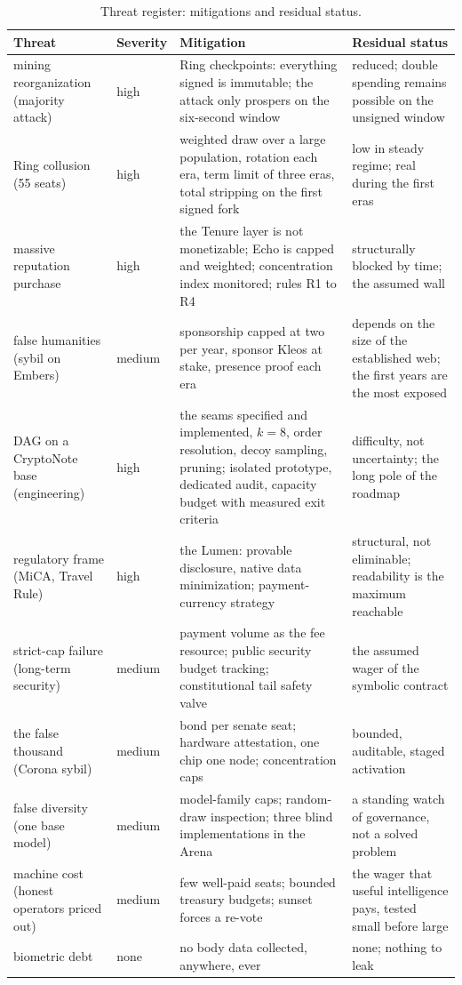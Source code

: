\begin{table}[htbp]
\centering
\small
\caption{Threat register: mitigations and residual status.}
\label{tab:threats}
\begin{tabularx}{\textwidth}{@{}L{3.4cm}L{1.5cm}YY@{}}
\toprule
Threat & Severity & Mitigation & Residual status \\
\midrule
mining reorganization (majority attack) & high & Ring checkpoints: everything signed is immutable; the attack only prospers on the six-second window & reduced; double spending remains possible on the unsigned window \\
Ring collusion (55 seats) & high & weighted draw over a large population, rotation each era, term limit of three eras, total stripping on the first signed fork & low in steady regime; real during the first eras \\
massive reputation purchase & high & the Tenure layer is not monetizable; Echo is capped and weighted; concentration index monitored; rules R1 to R4 & structurally blocked by time; the assumed wall \\
false humanities (sybil on Embers) & medium & sponsorship capped at two per year, sponsor Kleos at stake, presence proof each era & depends on the size of the established web; the first years are the most exposed \\
DAG on a CryptoNote base (engineering) & high & the seams specified and implemented, $k = 8$, order resolution, decoy sampling, pruning; isolated prototype, dedicated audit, capacity budget with measured exit criteria & difficulty, not uncertainty; the long pole of the roadmap \\
regulatory frame (MiCA, Travel Rule) & high & the Lumen: provable disclosure, native data minimization; payment-currency strategy & structural, not eliminable; readability is the maximum reachable \\
strict-cap failure (long-term security) & medium & payment volume as the fee resource; public security budget tracking; constitutional tail safety valve & the assumed wager of the symbolic contract \\
the false thousand (Corona sybil) & medium & bond per senate seat; hardware attestation, one chip one node; concentration caps & bounded, auditable, staged activation \\
false diversity (one base model) & medium & model-family caps; random-draw inspection; three blind implementations in the Arena & a standing watch of governance, not a solved problem \\
machine cost (honest operators priced out) & medium & few well-paid seats; bounded treasury budgets; sunset forces a re-vote & the wager that useful intelligence pays, tested small before large \\
biometric debt & none & no body data collected, anywhere, ever & none; nothing to leak \\
\bottomrule
\end{tabularx}
\end{table}

